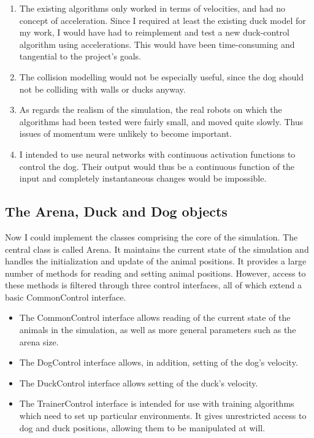 \documentclass[a4paper]{report}
\newcommand{\code}[1]{{\ttfamily #1}}
\begin{document}
\begin{enumerate}
  
\item The existing algorithms only worked in terms of velocities, and
  had no concept of acceleration. Since I required at least the
  existing duck model for my work, I would have had to reimplement and
  test a new duck-control algorithm using accelerations. This would
  have been time-consuming and tangential to the project's goals.
  
\item The collision modelling would not be especially useful, since
  the dog should not be colliding with walls or ducks anyway.
  
\item As regards the realism of the simulation, the real robots on
  which the algorithms had been tested were fairly small, and moved
  quite slowly. Thus issues of momentum were unlikely to become
  important.

\item I intended to use neural networks with continuous activation
  functions to control the dog. Their output would thus be a
  continuous function of the input and completely instantaneous
  changes would be impossible.

\end{enumerate}

\subsection{The Arena, Duck and Dog objects}

Now I could implement the classes comprising the core of the
simulation. The central class is called \code{Arena}. It maintains the
current state of the simulation and handles the initialization and
update of the animal positions. It provides a large number of methods
for reading and setting animal positions. However, access to these
methods is filtered through three control interfaces, all of which
extend a basic \code{CommonControl} interface.

\begin{itemize}
  
\item The \code{CommonControl} interface allows reading of the current
  state of the animals in the simulation, as well as more general
  parameters such as the arena size.
  
\item The \code{DogControl} interface allows, in addition, setting of
  the dog's velocity.
  
\item The \code{DuckControl} interface allows setting of the duck's
  velocity.
  
\item The \code{TrainerControl} interface is intended for use with
  training algorithms which need to set up particular environments. It
  gives unrestricted access to dog and duck positions, allowing them
  to be manipulated at will.

\end{itemize}
\end{document}

